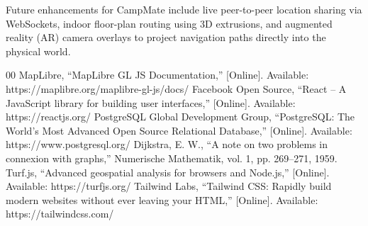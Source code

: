 \documentclass[conference]{IEEEtran}
\begin{document}
Future enhancements for CampMate include live peer-to-peer location sharing via WebSockets, indoor floor-plan routing using 3D extrusions, and augmented reality (AR) camera overlays to project navigation paths directly into the physical world.

\begin{thebibliography}{00}
 MapLibre, ``MapLibre GL JS Documentation,'' [Online]. Available: https://maplibre.org/maplibre-gl-js/docs/
 Facebook Open Source, ``React – A JavaScript library for building user interfaces,'' [Online]. Available: https://reactjs.org/
 PostgreSQL Global Development Group, ``PostgreSQL: The World's Most Advanced Open Source Relational Database,'' [Online]. Available: https://www.postgresql.org/
 Dijkstra, E. W., ``A note on two problems in connexion with graphs,'' Numerische Mathematik, vol. 1, pp. 269–271, 1959.
 Turf.js, ``Advanced geospatial analysis for browsers and Node.js,'' [Online]. Available: https://turfjs.org/
 Tailwind Labs, ``Tailwind CSS: Rapidly build modern websites without ever leaving your HTML,'' [Online]. Available: https://tailwindcss.com/
\end{thebibliography}
\end{document}
